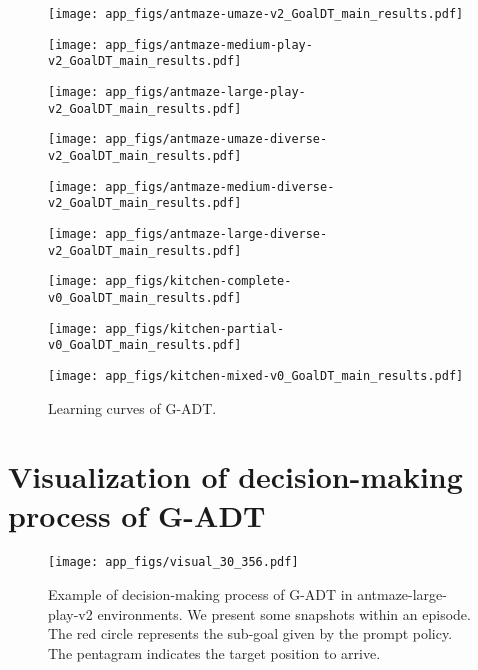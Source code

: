 \begin{figure}[!htbp]
\centering


\begin{minipage}[t]{0.3\textwidth}
\centering
\texttt{[image: app\_figs/antmaze-umaze-v2\_GoalDT\_main\_results.pdf]}
\end{minipage}
\begin{minipage}[t]{0.3\textwidth}
\centering
\texttt{[image: app\_figs/antmaze-medium-play-v2\_GoalDT\_main\_results.pdf]}
\end{minipage}
\begin{minipage}[t]{0.3\textwidth}
\centering
\texttt{[image: app\_figs/antmaze-large-play-v2\_GoalDT\_main\_results.pdf]}
\end{minipage}

\begin{minipage}[t]{0.3\textwidth}
\centering
\texttt{[image: app\_figs/antmaze-umaze-diverse-v2\_GoalDT\_main\_results.pdf]}
\end{minipage}
\begin{minipage}[t]{0.3\textwidth}
\centering
\texttt{[image: app\_figs/antmaze-medium-diverse-v2\_GoalDT\_main\_results.pdf]}
\end{minipage}
\begin{minipage}[t]{0.3\textwidth}
\centering
\texttt{[image: app\_figs/antmaze-large-diverse-v2\_GoalDT\_main\_results.pdf]}
\end{minipage}

\begin{minipage}[t]{0.3\textwidth}
\centering
\texttt{[image: app\_figs/kitchen-complete-v0\_GoalDT\_main\_results.pdf]}
\end{minipage}
\begin{minipage}[t]{0.3\textwidth}
\centering
\texttt{[image: app\_figs/kitchen-partial-v0\_GoalDT\_main\_results.pdf]}
\end{minipage}
\begin{minipage}[t]{0.3\textwidth}
\centering
\texttt{[image: app\_figs/kitchen-mixed-v0\_GoalDT\_main\_results.pdf]}
\end{minipage}


\caption{Learning curves of G-ADT.}
\label{fig:learning_curves}
\end{figure}





\section{Visualization of decision-making process of G-ADT}
\begin{figure}[!htbp]
\centering
\texttt{[image: app\_figs/visual\_30\_356.pdf]}
\caption{Example of decision-making process of G-ADT in antmaze-large-play-v2 environments. We present some snapshots within an episode. The red circle represents the sub-goal given by the prompt policy. The pentagram indicates the target position to arrive.}
\label{fig:visualization}
\end{figure}%

